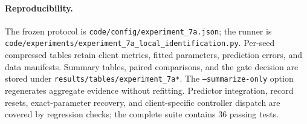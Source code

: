 \paragraph{Reproducibility.}
The frozen protocol is \texttt{code/config/experiment\_7a.json}; the runner is
\texttt{code/experiments/experiment\_7a\_local\_identification.py}.
Per-seed compressed tables retain client metrics, fitted parameters, prediction
errors, and data manifests. Summary tables, paired comparisons, and the gate
decision are stored under \texttt{results/tables/experiment\_7a*}.
The \texttt{--summarize-only} option regenerates aggregate evidence without
refitting. Predictor integration, record resets, exact-parameter recovery,
and client-specific controller dispatch are covered by regression checks;
the complete suite contains 36 passing tests.
